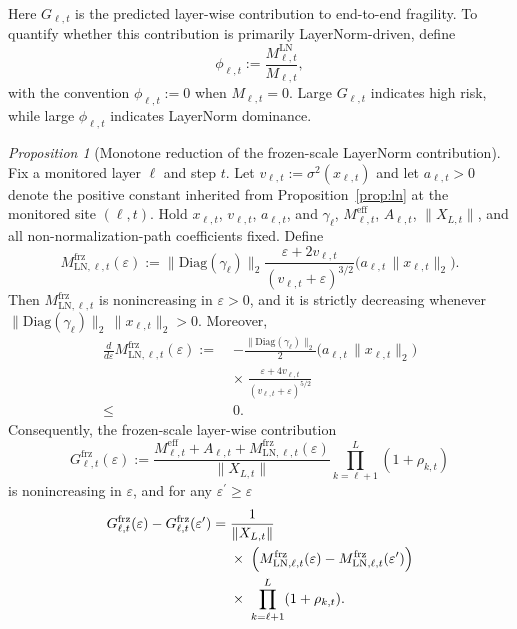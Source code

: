 \documentclass[twoside]{article}
\theoremstyle{definition}
\theoremstyle{remark}
\newtheorem{proposition}{Proposition}
\begin{document}
Here $G_{\ell,t}$ is the predicted layer-wise contribution to end-to-end
fragility. To quantify whether this contribution is primarily LayerNorm-driven,
define
\begin{equation}
\label{eq:bgss-phi}
\phi_{\ell,t}
:=
\frac{M^{\mathrm{LN}}_{\ell,t}}{M_{\ell,t}},
\end{equation}
with the convention $\phi_{\ell,t}:=0$ when $M_{\ell,t}=0$. Large $G_{\ell,t}$
indicates high risk, while large $\phi_{\ell,t}$ indicates LayerNorm dominance.

\begin{proposition}[Monotone reduction of the frozen-scale LayerNorm contribution]
\label{prop:bgss}
Fix a monitored layer $\ell$ and step $t$. Let $v_{\ell,t}:=\sigma^2(x_{\ell,t})$ and let
$a_{\ell,t}>0$ denote the positive constant inherited from
Proposition~\ref{prop:ln} at the monitored site $(\ell,t)$. Hold $x_{\ell,t}$,
$v_{\ell,t}$, $a_{\ell,t}$, and $\gamma_\ell$,
$M^{\mathrm{eff}}_{\ell,t}$, $A_{\ell,t}$, $\|X_{L,t}\|$, and all
non-normalization-path coefficients fixed. Define
\begin{equation}
\label{eq:bgss-cln}
M_{\mathrm{LN},\ell,t}^{\mathrm{frz}}(\varepsilon)
:=
\|\mathrm{Diag}(\gamma_\ell)\|_2
\frac{\varepsilon+2v_{\ell,t}}{(v_{\ell,t}+\varepsilon)^{3/2}}
\bigl(a_{\ell,t}\,\|x_{\ell,t}\|_2\bigr).
\end{equation}
Then $M_{\mathrm{LN},\ell,t}^{\mathrm{frz}}$ is nonincreasing in $\varepsilon>0$, and it is
strictly decreasing whenever
$\|\mathrm{Diag}(\gamma_\ell)\|_2\,\|x_{\ell,t}\|_2>0$. Moreover,
\begin{equation}
\label{eq:bgss-derivative}
\begin{split}
\frac{d}{d\varepsilon}M_{\mathrm{LN},\ell,t}^{\mathrm{frz}}(\varepsilon)
:=\;&
-\frac{\|\mathrm{Diag}(\gamma_\ell)\|_2}{2}
\bigl(a_{\ell,t}\,\|x_{\ell,t}\|_2\bigr)
\\
&\times\;\frac{\varepsilon+4v_{\ell,t}}{(v_{\ell,t}+\varepsilon)^{5/2}}
\\
\le\;&0.
\end{split}
\end{equation}
Consequently, the frozen-scale layer-wise contribution
\begin{equation}
\label{eq:bgss-g-eps}
G_{\ell,t}^{\mathrm{frz}}(\varepsilon)
:=
\frac{
M^{\mathrm{eff}}_{\ell,t}
+
A_{\ell,t}
+
M_{\mathrm{LN},\ell,t}^{\mathrm{frz}}(\varepsilon)
}{\|X_{L,t}\|}
\prod_{k=\ell+1}^{L}(1+\rho_{k,t})
\end{equation}
is nonincreasing in $\varepsilon$, and for any $\varepsilon^{\prime}\ge\varepsilon$
\begin{equation}
\label{eq:bgss-reduction}
\begin{split}
G_{\ell,t}^{\mathrm{frz}}(\varepsilon)
- G_{\ell,t}^{\mathrm{frz}}(\varepsilon^{\prime})
=\;&
\frac{1}{\|X_{L,t}\|}
\\
&\times\;\Bigl(
M_{\mathrm{LN},\ell,t}^{\mathrm{frz}}(\varepsilon)
-
M_{\mathrm{LN},\ell,t}^{\mathrm{frz}}(\varepsilon^{\prime})
\Bigr)
\\
&\times\;\prod_{k=\ell+1}^{L}(1+\rho_{k,t}).
\end{split}
\end{equation}
\end{proposition}
\end{document}
